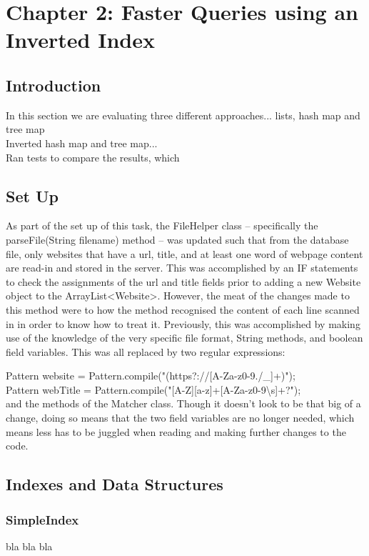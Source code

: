\chapter{Chapter 2: Faster Queries using an Inverted Index}


\section{Introduction}
In this section we are evaluating three different approaches... lists, hash map and tree map \\
Inverted hash map and tree map...\\
Ran tests to compare the results, which \\

\section{Set Up}
As part of the set up of this task, the FileHelper class – specifically the \\ parseFile(String filename) method – was updated such that from the database file, only websites that have a url, title, and at least one word of webpage content are read-in and stored in the server.
This was accomplished by an IF statements to check the assignments of the url and title fields prior to adding a new Website object to the ArrayList<Website>.
However, the meat of the changes made to this method were to how the method recognised the content of each line scanned in in order to know how to treat it.
Previously, this was accomplished by making use of the knowledge of the very specific file format, String methods, and boolean field variables.
This was all replaced by two regular expressions:

Pattern website = Pattern.compile("(https?://[A-Za-z0-9./\_]+)"); \\
Pattern webTitle = Pattern.compile("[A-Z][a-z]+[A-Za-z0-9\textbackslash s]+?"); \\

and the methods of the Matcher class. Though it doesn’t look to be that big of a change, doing so means that the two field variables are no longer needed, which means less has to be juggled when reading and making further changes to the code.

\section{Indexes and Data Structures}
\subsection{SimpleIndex}
bla bla bla
